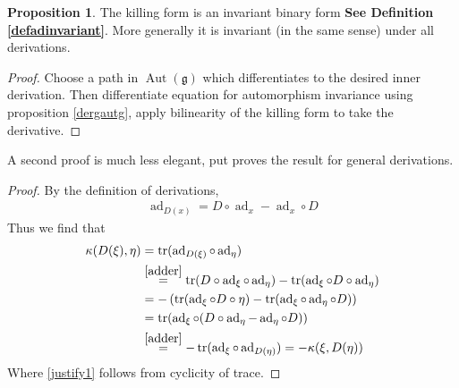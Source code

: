 \documentclass[10.5pt]{article}
\theoremstyle{definition}
\newtheorem{proposition}{Proposition}
\numberwithin{example}{subsection}
\numberwithin{proposition}{subsection}
\numberwithin{pb}{subsection}
\begin{document}
        \begin{proposition}\label{killingadinvariant}
            The killing form is an invariant binary form \textbf{See Definition \ref{defadinvariant}}. More generally it is invariant (in the same sense) under all derivations.

            \begin{proof}
                Choose a path in \(\operatorname{Aut}(\mathfrak{g})\) which differentiates to the desired inner derivation. Then differentiate equation for automorphism invariance using proposition \ref{dergautg}, apply bilinearity of the killing form to take the derivative.
            \end{proof}

            A second proof is much less elegant, put proves the result for general derivations.
            \begin{proof}
                By the definition of derivations,
                \begin{align}\label{adder}
                    \operatorname{ad}_{D(x)} = D\circ \operatorname{ad}_x  - \operatorname{ad}_x\circ D
                \end{align}
                Thus we find that
                \begin{align}
                    \kappa(D(\xi),\eta) &= \operatorname{tr}(\operatorname{ad}_{D(\xi)}\circ\operatorname{ad}_\eta) \\
                    & \overset{\eqref{adder}}{=} \operatorname{tr}(D\circ \operatorname{ad}_\xi\circ \operatorname{ad}_\eta)  - \operatorname{tr}(\operatorname{ad}_\xi\circ D\circ \operatorname{ad}_\eta) \\
                    &= - \left(\operatorname{tr}(\operatorname{ad}_\xi\circ D \circ \eta) - \operatorname{tr}(\operatorname{ad}_\xi \circ \operatorname{ad}_\eta \circ D) \right) \label{justify1} \\
                    &=\operatorname{tr}(\operatorname{ad}_\xi \circ(D\circ \operatorname{ad}_\eta  - \operatorname{ad}_\eta\circ D)) \\
                    & \overset{\eqref{adder}}{=} - \operatorname{tr}(\operatorname{ad}_\xi \circ \operatorname{ad}_{D(\eta)}) = -\kappa(\xi,D(\eta))
                \end{align}
                Where \eqref{justify1} follows from cyclicity of trace.
            \end{proof}
        \end{proposition}
\end{document}
